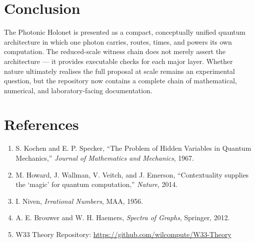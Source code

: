 \documentclass[11pt]{article}
\begin{document}
\section{Conclusion}
The Photonic Holonet is presented as a compact, conceptually unified quantum architecture in which one photon carries, routes, times, and powers its own computation. The reduced-scale witness chain does not merely assert the architecture --- it provides executable checks for each major layer. Whether nature ultimately realises the full proposal at scale remains an experimental question, but the repository now contains a complete chain of mathematical, numerical, and laboratory-facing documentation.

\section*{References}
\begin{enumerate}[leftmargin=1.5em]
    \item S. Kochen and E. P. Specker, ``The Problem of Hidden Variables in Quantum Mechanics,'' \textit{Journal of Mathematics and Mechanics}, 1967.
    \item M. Howard, J. Wallman, V. Veitch, and J. Emerson, ``Contextuality supplies the `magic' for quantum computation,'' \textit{Nature}, 2014.
    \item I. Niven, \textit{Irrational Numbers}, MAA, 1956.
    \item A. E. Brouwer and W. H. Haemers, \textit{Spectra of Graphs}, Springer, 2012.
    \item W33 Theory Repository: \url{https://github.com/wilcompute/W33-Theory}
\end{enumerate}
\end{document}
